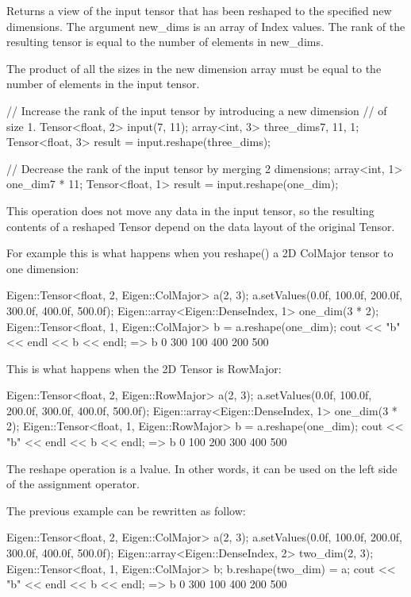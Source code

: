Returns a view of the input tensor that has been reshaped to the specified new dimensions. The argument new\+\_\+dims is an array of Index values. The rank of the resulting tensor is equal to the number of elements in new\+\_\+dims.

The product of all the sizes in the new dimension array must be equal to the number of elements in the input tensor. \begin{DoxyVerb}// Increase the rank of the input tensor by introducing a new dimension
// of size 1.
Tensor<float, 2> input(7, 11);
array<int, 3> three_dims{{7, 11, 1}};
Tensor<float, 3> result = input.reshape(three_dims);

// Decrease the rank of the input tensor by merging 2 dimensions;
array<int, 1> one_dim{{7 * 11}};
Tensor<float, 1> result = input.reshape(one_dim);
\end{DoxyVerb}


This operation does not move any data in the input tensor, so the resulting contents of a reshaped Tensor depend on the data layout of the original Tensor.

For example this is what happens when you {\ttfamily reshape()} a 2D Col\+Major tensor to one dimension\+: \begin{DoxyVerb}Eigen::Tensor<float, 2, Eigen::ColMajor> a(2, 3);
a.setValues({{0.0f, 100.0f, 200.0f}, {300.0f, 400.0f, 500.0f}});
Eigen::array<Eigen::DenseIndex, 1> one_dim({3 * 2});
Eigen::Tensor<float, 1, Eigen::ColMajor> b = a.reshape(one_dim);
cout << "b" << endl << b << endl;
=>
b
  0
300
100
400
200
500
\end{DoxyVerb}


This is what happens when the 2D Tensor is Row\+Major\+: \begin{DoxyVerb}Eigen::Tensor<float, 2, Eigen::RowMajor> a(2, 3);
a.setValues({{0.0f, 100.0f, 200.0f}, {300.0f, 400.0f, 500.0f}});
Eigen::array<Eigen::DenseIndex, 1> one_dim({3 * 2});
Eigen::Tensor<float, 1, Eigen::RowMajor> b = a.reshape(one_dim);
cout << "b" << endl << b << endl;
=>
b
  0
100
200
300
400
500
\end{DoxyVerb}


The reshape operation is a lvalue. In other words, it can be used on the left side of the assignment operator.

The previous example can be rewritten as follow\+: \begin{DoxyVerb}Eigen::Tensor<float, 2, Eigen::ColMajor> a(2, 3);
a.setValues({{0.0f, 100.0f, 200.0f}, {300.0f, 400.0f, 500.0f}});
Eigen::array<Eigen::DenseIndex, 2> two_dim({2, 3});
Eigen::Tensor<float, 1, Eigen::ColMajor> b;
b.reshape(two_dim) = a;
cout << "b" << endl << b << endl;
=>
b
  0
300
100
400
200
500
\end{DoxyVerb}


